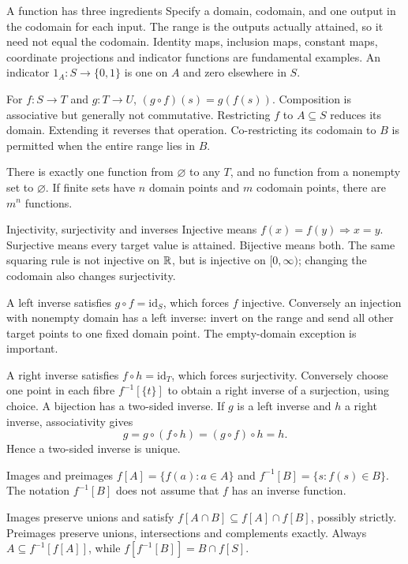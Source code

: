 \begin{note}{A function has three ingredients}
Specify a domain, codomain, and one output in the codomain for each input. The range is the outputs actually attained, so it need not equal the codomain. Identity maps, inclusion maps, constant maps, coordinate projections and indicator functions are fundamental examples. An indicator $1_A:S\to\{0,1\}$ is one on $A$ and zero elsewhere in $S$.

For $f:S\to T$ and $g:T\to U$, $(g\circ f)(s)=g(f(s))$. Composition is associative but generally not commutative. Restricting $f$ to $A\subseteq S$ reduces its domain. Extending it reverses that operation. Co-restricting its codomain to $B$ is permitted when the entire range lies in $B$.

There is exactly one function from $\varnothing$ to any $T$, and no function from a nonempty set to $\varnothing$. If finite sets have $n$ domain points and $m$ codomain points, there are $m^n$ functions.
\end{note}
\begin{note}{Injectivity, surjectivity and inverses}
Injective means $f(x)=f(y)\Rightarrow x=y$. Surjective means every target value is attained. Bijective means both. The same squaring rule is not injective on $\mathbb R$, but is injective on $[0,\infty)$; changing the codomain also changes surjectivity.

A left inverse satisfies $g\circ f=\mathrm{id}_S$, which forces $f$ injective. Conversely an injection with nonempty domain has a left inverse: invert on the range and send all other target points to one fixed domain point. The empty-domain exception is important.

A right inverse satisfies $f\circ h=\mathrm{id}_T$, which forces surjectivity. Conversely choose one point in each fibre $f^{-1}[\{t\}]$ to obtain a right inverse of a surjection, using choice. A bijection has a two-sided inverse. If $g$ is a left inverse and $h$ a right inverse, associativity gives
\[g=g\circ(f\circ h)=(g\circ f)\circ h=h.\]
Hence a two-sided inverse is unique.
\end{note}
\begin{note}{Images and preimages}
$f[A]=\{f(a):a\in A\}$ and $f^{-1}[B]=\{s:f(s)\in B\}$. The notation $f^{-1}[B]$ does not assume that $f$ has an inverse function.

Images preserve unions and satisfy $f[A\cap B]\subseteq f[A]\cap f[B]$, possibly strictly. Preimages preserve unions, intersections and complements exactly. Always $A\subseteq f^{-1}[f[A]]$, while $f[f^{-1}[B]]=B\cap f[S]$.
\end{note}
